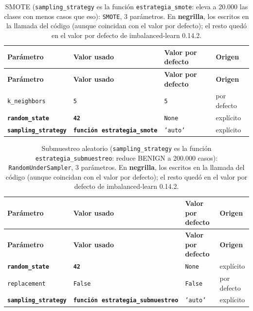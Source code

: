 \documentclass[11pt,a4paper]{article}
\begin{document}
{%
\begin{longtable}{L{3.9cm} L{3.7cm} L{3.0cm} L{2.4cm}}
\caption{SMOTE (\texttt{sampling\_strategy} es la función \texttt{estrategia\_smote}: eleva a 20.000 las clases con menos casos que eso): \texttt{SMOTE}, 3 parámetros. En \textbf{negrilla}, los escritos en la llamada del código (aunque coincidan con el valor por defecto); el resto quedó en el valor por defecto de imbalanced-learn 0.14.2.}\label{tab:param-smote}\\
\toprule
\textbf{Parámetro} & \textbf{Valor usado} & \textbf{Valor por defecto} & \textbf{Origen} \\
\midrule
\endfirsthead
\toprule
\textbf{Parámetro} & \textbf{Valor usado} & \textbf{Valor por defecto} & \textbf{Origen} \\
\midrule
\endhead
\bottomrule
\endfoot
\texttt{k\_neighbors} & \texttt{5} & \texttt{5} & por defecto \\
\textbf{\texttt{random\_state}} & \textbf{\texttt{42}} & \texttt{None} & explícito \\
\textbf{\texttt{sampling\_strategy}} & \textbf{\texttt{función}\allowbreak\ \texttt{estrategia\_smote}} & \texttt{'auto'} & explícito \\
\end{longtable}

\begin{longtable}{L{3.9cm} L{3.7cm} L{3.0cm} L{2.4cm}}
\caption{Submuestreo aleatorio (\texttt{sampling\_strategy} es la función \texttt{estrategia\_submuestreo}: reduce BENIGN a 200.000 casos): \texttt{RandomUnderSampler}, 3 parámetros. En \textbf{negrilla}, los escritos en la llamada del código (aunque coincidan con el valor por defecto); el resto quedó en el valor por defecto de imbalanced-learn 0.14.2.}\label{tab:param-rus}\\
\toprule
\textbf{Parámetro} & \textbf{Valor usado} & \textbf{Valor por defecto} & \textbf{Origen} \\
\midrule
\endfirsthead
\toprule
\textbf{Parámetro} & \textbf{Valor usado} & \textbf{Valor por defecto} & \textbf{Origen} \\
\midrule
\endhead
\bottomrule
\endfoot
\textbf{\texttt{random\_state}} & \textbf{\texttt{42}} & \texttt{None} & explícito \\
\texttt{replacement} & \texttt{False} & \texttt{False} & por defecto \\
\textbf{\texttt{sampling\_strategy}} & \textbf{\texttt{función}\allowbreak\ \texttt{estrategia\_submuestreo}} & \texttt{'auto'} & explícito \\
\end{longtable}

}
\end{document}
